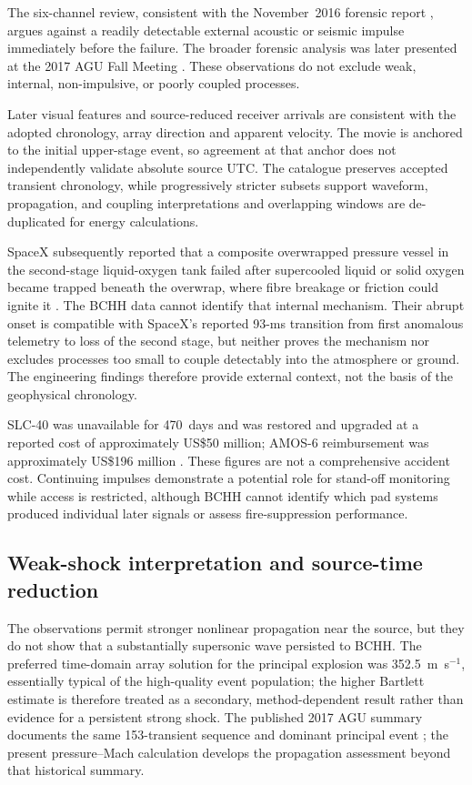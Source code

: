 \documentclass[]{seismica}
\begin{document}
The six-channel review, consistent with the November~2016 forensic report
\citep{thompson_mcnutt_fireball_2016}, argues against a readily detectable
external acoustic or seismic impulse immediately before the failure. The
broader forensic analysis was later presented at the 2017 AGU Fall Meeting
\citep{thompson_agu_falcon9_2017}. These observations do not exclude weak,
internal, non-impulsive, or poorly coupled processes.

Later visual features and source-reduced receiver arrivals are consistent
with the adopted chronology, array direction and apparent velocity. The
movie is anchored to the initial upper-stage event, so agreement at that
anchor does not independently validate absolute source UTC. The
catalogue preserves accepted transient chronology, while progressively stricter
subsets support waveform, propagation, and coupling interpretations and
overlapping windows are de-duplicated for energy calculations.

SpaceX subsequently reported that a composite overwrapped pressure vessel in
the second-stage liquid-oxygen tank failed after supercooled liquid or solid
oxygen became trapped beneath the overwrap, where fibre breakage or friction
could ignite it \citep{spacex_anomaly_2017,nasa_sma_falcon9}. The BCHH data
cannot identify that internal mechanism. Their abrupt onset is compatible with
SpaceX's reported 93-ms transition from first anomalous telemetry to loss of
the second stage, but neither proves the mechanism nor excludes processes too
small to couple detectably into the atmosphere or ground. The engineering
findings therefore provide external context, not the basis of the geophysical
chronology.

SLC-40 was unavailable for 470~days and was restored and upgraded at a reported
cost of approximately US\$50 million; AMOS-6 reimbursement was approximately
US\$196 million \citep{clark_slc40_2017,magan_amos6_2016,
spacex_crs13_2017}. These figures are not a comprehensive accident cost.
Continuing impulses demonstrate a potential role for stand-off monitoring
while access is restricted, although BCHH cannot identify which pad systems
produced individual later signals or assess fire-suppression performance.

\subsection{Weak-shock interpretation and source-time reduction}

The observations permit stronger nonlinear propagation near the source, but
they do not show that a substantially supersonic wave persisted to BCHH. The
preferred time-domain array solution for the principal explosion was
352.5~m~s$^{-1}$, essentially typical of the high-quality event population;
the higher Bartlett estimate is therefore treated as a secondary,
method-dependent result rather than evidence for a persistent strong shock.
The published 2017 AGU summary documents the same 153-transient sequence and
dominant principal event \citep{thompson_agu_falcon9_2017}; the present
pressure--Mach calculation develops the propagation assessment beyond that
historical summary.
\end{document}
